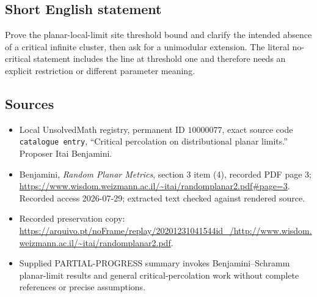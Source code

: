 \documentclass[11pt]{article}
\begin{document}
\subsection{Short English statement}
Prove the planar-local-limit site threshold bound and clarify the intended absence of a critical infinite cluster, then ask for a unimodular extension. The literal no-critical statement includes the line at threshold one and therefore needs an explicit restriction or different parameter meaning.
\subsection{Sources}
\begin{itemize}
\item Local UnsolvedMath registry, permanent ID \(10000077\), exact source code \texttt{catalogue entry}, ``Critical percolation on distributional planar limits.'' Proposer Itai Benjamini.
\item Benjamini, \emph{Random Planar Metrics}, section 3 item (4), recorded PDF page 3; \url{https://www.wisdom.weizmann.ac.il/~itai/randomplanar2.pdf#page=3}. Recorded access 2026-07-29; extracted text checked against rendered source.
\item Recorded preservation copy: \url{https://arquivo.pt/noFrame/replay/20201231041544id_/http://www.wisdom.weizmann.ac.il/~itai/randomplanar2.pdf}.
\item Supplied PARTIAL-PROGRESS summary invokes Benjamini--Schramm planar-limit results and general critical-percolation work without complete references or precise assumptions.
\end{itemize}
\end{document}
